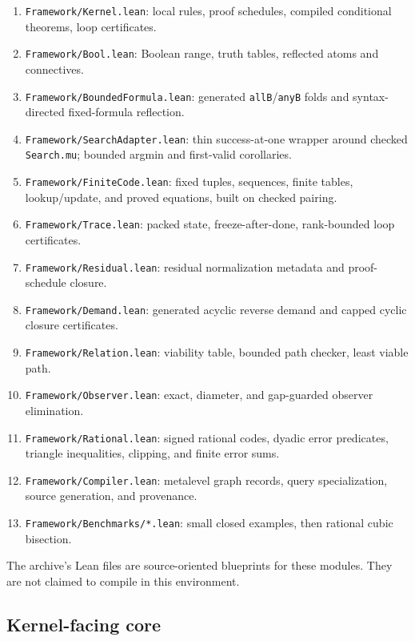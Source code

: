 \begin{enumerate}[label=\textbf{F\arabic*.}]
  \item \texttt{Framework/Kernel.lean}: local rules, proof schedules, compiled conditional theorems, loop certificates.
  \item \texttt{Framework/Bool.lean}: Boolean range, truth tables, reflected atoms and connectives.
  \item \texttt{Framework/BoundedFormula.lean}: generated \texttt{allB}/\texttt{anyB} folds and syntax-directed fixed-formula reflection.
  \item \texttt{Framework/SearchAdapter.lean}: thin success-at-one wrapper around checked \texttt{Search.mu}; bounded argmin and first-valid corollaries.
  \item \texttt{Framework/FiniteCode.lean}: fixed tuples, sequences, finite tables, lookup/update, and proved equations, built on checked pairing.
  \item \texttt{Framework/Trace.lean}: packed state, freeze-after-done, rank-bounded loop certificates.
  \item \texttt{Framework/Residual.lean}: residual normalization metadata and proof-schedule closure.
  \item \texttt{Framework/Demand.lean}: generated acyclic reverse demand and capped cyclic closure certificates.
  \item \texttt{Framework/Relation.lean}: viability table, bounded path checker, least viable path.
  \item \texttt{Framework/Observer.lean}: exact, diameter, and gap-guarded observer elimination.
  \item \texttt{Framework/Rational.lean}: signed rational codes, dyadic error predicates, triangle inequalities, clipping, and finite error sums.
  \item \texttt{Framework/Compiler.lean}: metalevel graph records, query specialization, source generation, and provenance.
  \item \texttt{Framework/Benchmarks/*.lean}: small closed examples, then rational cubic bisection.
\end{enumerate}
The archive's Lean files are source-oriented blueprints for these modules.  They are not claimed to compile in this environment.

\subsection{Kernel-facing core}

